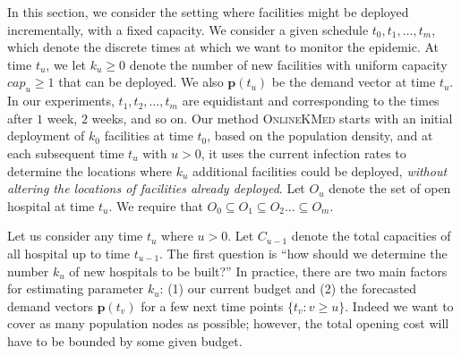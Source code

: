 
In this section, we consider the setting where facilities might be deployed incrementally, with a fixed capacity. We consider a given schedule $t_0, t_1, \ldots, t_m$, which denote the discrete times at which we want to monitor the epidemic. At time $t_u$, we let $k_u \geq 0$ denote the number of new facilities with uniform capacity $cap_u \geq 1$ that can be deployed. We also $\mathbf{p}(t_u)$ be the demand vector at time $t_u$. In our experiments, $t_1, t_2, \ldots, t_m$ are equidistant and corresponding to the times after $1$ week, $2$ weeks, and so on. Our method \textsc{OnlineKMed} starts with an initial
deployment of $k_0$ facilities at time $t_0$, based on the population density, and at each subsequent time $t_u$ with $u > 0$, it uses the current infection rates to determine the locations where $k_u$ additional facilities could be deployed, \emph{without altering the locations of facilities already deployed}. Let $O_u$ denote the set of open hospital at time $t_u$. We require that $O_0 \subseteq O_1 \subseteq O_2 \ldots \subseteq O_m$.

Let us consider any time $t_u$ where $u > 0$. Let $C_{u-1}$ denote the total capacities of all hospital up to time $t_{u-1}$. The first question is ``how should we determine the number $k_u$ of new hospitals to be built?'' In practice, there are two main factors for estimating parameter $k_u$: (1) our current budget and (2) the forecasted demand vectors $\mathbf{p}(t_v)$ for a few next time points $\{t_v: v \geq u\}$. Indeed we want to cover as many population nodes as possible; however, the total opening cost will have to be bounded by some given budget.

